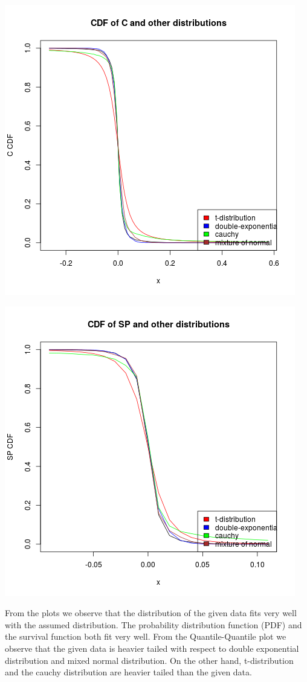 \documentclass{article}
\begin{document}
\includegraphics{"plotd1"}
\pagebreak

\includegraphics{"plotd2"}
\pagebreak

From the plots we observe that the distribution of the given data fits very well with the assumed distribution. The probability distribution function (PDF) and the survival function both fit very well. From the Quantile-Quantile plot we observe that the given data is heavier tailed with respect to double exponential distribution and mixed normal distribution. On the other hand, t-distribution and the cauchy distribution are heavier tailed than the given data.
\end{document}
